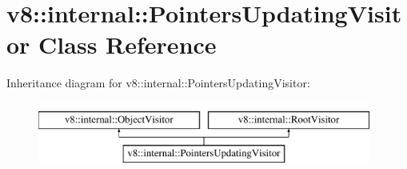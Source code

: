 \hypertarget{classv8_1_1internal_1_1PointersUpdatingVisitor}{}\section{v8\+:\+:internal\+:\+:Pointers\+Updating\+Visitor Class Reference}
\label{classv8_1_1internal_1_1PointersUpdatingVisitor}
Inheritance diagram for v8\+:\+:internal\+:\+:Pointers\+Updating\+Visitor\+:\begin{figure}[H]
\begin{center}
\leavevmode
\includegraphics[height=2.000000cm]{classv8_1_1internal_1_1PointersUpdatingVisitor}
\end{center}
\end{figure}
